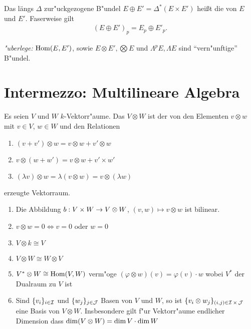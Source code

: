 \begin{center}\end{center}

Das längs $\Delta$ zur"uckgezogene B"undel $E \oplus E' = \Delta^{\ast}(E \times E')$ heißt die  von $E$ und $E'$.
Faserweise gilt
\begin{align*}
  (E \oplus E')_p = E_p \oplus E'_p.
\end{align*}
 
\emph{"uberlege:} $\operatorname{Hom}(E,E')$, sowie $E \otimes E', \bigotimes E$ und $\Lambda^pE, \Lambda E$ sind "`vern"unftige"' B"undel.

\section{Intermezzo: Multilineare Algebra}
Es seien $V$ und $W$ $k$-Vektorr"aume. Das  $V \otimes W$ ist der von den Elementen $v \otimes w$ mit $v \in V$, $w \in W$ und den Relationen \begin{enumerate}[label=(\roman*),widest=iii]
\item
	$(v + v') \otimes w = v \otimes w + v' \otimes w$
\item
	$v \otimes (w + w') = v \otimes w + v' \times w'$
\item
	$(\lambda v) \otimes w = \lambda (v \otimes w) = v \otimes (\lambda w)$
\end{enumerate} erzeugte Vektorraum.

\begin{emptythm}[Eigenschaften:]\begin{enumerate}[label=\arabic*),leftmargin=*]
\item
	Die Abbildung $b: V \times W \to V \otimes W$, $(v, w) \mapsto v \otimes w$ ist bilinear.
\item
	$v \otimes w = 0 \Leftrightarrow v = 0$ oder $w = 0$
\item
	$V \otimes k \cong V$
\item
	$V \otimes W \cong W \otimes V$
\item
	$V^* \otimes W \cong \operatorname{Hom}(V, W)$ verm"oge $(\varphi \otimes w)(v) = \varphi(v) \cdot w$ wobei $V^*$ der \gls{Dualraum} zu $V$ ist
\item
	Sind $\{v_i\}_{i \in \operatorname{\mathcal{I}}}$ und $\{w_j\}_{j \in \operatorname{\mathcal{J}}}$ Basen von $V$ und $W$, so ist $\{v_i \otimes w_j\}_{(i,j) \in \operatorname{\mathcal{I}} \times \operatorname{\mathcal{J}}}$ eine Basis von $V \otimes W$. Insbesondere gilt f"ur Vektorr"aume endlicher Dimension dass $\operatorname{dim} (V \otimes W) = \operatorname{dim} V \cdot \operatorname{dim} W$
\end{enumerate}\end{emptythm}


